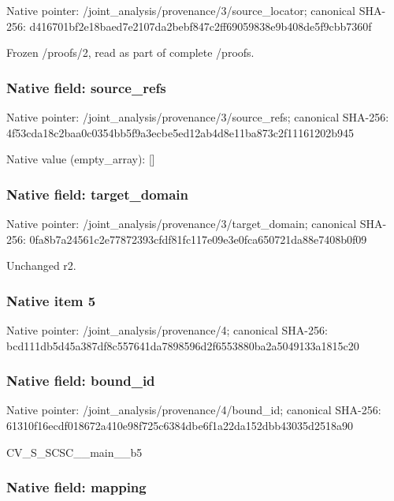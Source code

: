 \documentclass[10pt,a4paper]{article}
\begin{document}
Native pointer: /joint\_analysis/provenan\allowbreak{}ce/3/source\_locator; canonical SHA-256: d416701bf2e18baed7e2107d\allowbreak{}a2bebf847c2ff69059838e9b\allowbreak{}408de5f9cbb7360f


Frozen /proofs/2, read as part of complete /proofs.


\subsubsection{Native field: source\_refs}


Native pointer: /joint\_analysis/provenan\allowbreak{}ce/3/source\_refs; canonical SHA-256: 4f53cda18c2baa0c0354bb5f\allowbreak{}9a3ecbe5ed12ab4d8e11ba87\allowbreak{}3c2f11161202b945



Native value (empty\_array): []



\subsubsection{Native field: target\_domain}


Native pointer: /joint\_analysis/provenan\allowbreak{}ce/3/target\_domain; canonical SHA-256: 0fa8b7a24561c2e77872393c\allowbreak{}fdf81fc117e09e3e0fca6507\allowbreak{}21da88e7408b0f09


Unchanged r2.


\subsubsection{Native item 5}


Native pointer: /joint\_analysis/provenance/4; canonical SHA-256: bcd111db5d45a387df8c5576\allowbreak{}41da7898596d2f6553880ba2\allowbreak{}a5049133a1815c20



\subsubsection{Native field: bound\_id}


Native pointer: /joint\_analysis/provenance/4/bound\_id; canonical SHA-256: 61310f16ecdf018672a410e9\allowbreak{}8f725c6384dbe6f1a22da152\allowbreak{}dbb43035d2518a90


CV\_S\_SCSC\_\_main\_\_b5


\subsubsection{Native field: mapping}
\end{document}
